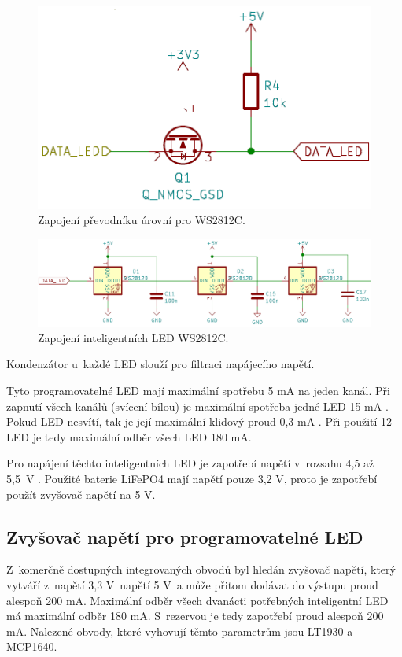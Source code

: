 \begin{figure}[!h]
  \begin{center}
    \includegraphics[scale=0.6]{obrazky/prevodnik_urovni_pro_WS2812C.png}
  \end{center}
  \caption[Zapojení převodníku úrovní pro WS2812C]{Zapojení převodníku úrovní pro WS2812C.}
\end{figure} 

\begin{figure}[!h]
  \begin{center}
    \includegraphics[scale=0.5]{obrazky/WS2812C.png}
  \end{center}
  \caption[Zapojení inteligentních LED WS2812C]{Zapojení inteligentních LED WS2812C.}
\end{figure}

Kondenzátor u~každé LED slouží pro filtraci napájecího napětí. 

Tyto programovatelné LED mají maximální spotřebu 5 mA na jeden kanál. Při zapnutí všech kanálů (svícení bílou) je maximální
spotřeba jedné LED 15 mA \cite{WS2812C_dtsh}. Pokud LED nesvítí, tak je její maximální klidový proud 0,3 mA \cite{WS2812C_dtsh}.
Při použití 12 LED je tedy maximální odběr všech LED 180 mA.

Pro napájení těchto inteligentních LED je zapotřebí napětí v~rozsahu 4,5 až 5,5~V \cite{WS2812C_dtsh}. 
Použité baterie LiFePO4 mají napětí pouze 3,2 V, proto je zapotřebí použít zvyšovač napětí na 5 V. 

\subsection{Zvyšovač napětí pro programovatelné LED}
Z~komerčně dostupných integrovaných obvodů byl hledán zvyšovač napětí, který vytváří z~napětí 3,3 V~napětí 5 V~a může přitom dodávat do výstupu proud alespoň 200 mA. 
Maximální odběr všech dvanácti potřebných inteligentní LED má maximální odběr 180 mA. S~rezervou je tedy zapotřebí proud alespoň 200 mA. Nalezené obvody, které vyhovují 
těmto parametrům jsou LT1930 a MCP1640. 

